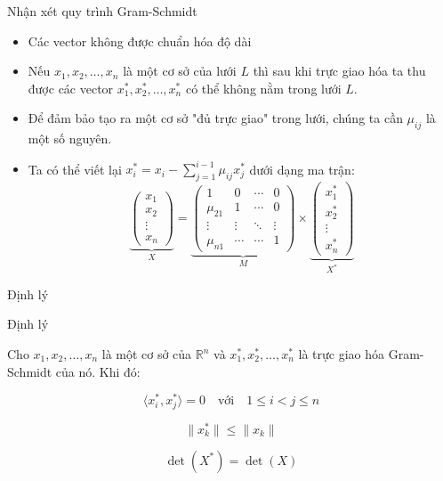 \begin{frame}{Nhận xét quy trình Gram-Schmidt}

\begin{itemize}
\item Các vector không được chuẩn hóa độ dài

\item Nếu $x_1, x_2, \dots, x_n$ là một cơ sở của lưới $L$ thì sau khi trực giao hóa ta thu được các vector $x_1^*, x_2^*, \dots, x_n^*$ có thể không nằm trong lưới $L$.
\item Để đảm bảo tạo ra một cơ sở "đủ trực giao" trong lưới, chúng ta cần $\mu_{ij}$ là một số nguyên.

\item Ta có thể viết lại $x_i^* = x_i - \sum_{j=1}^{i-1} \mu_{ij} x_j^*$ dưới dạng ma trận:
$$\underbrace{\left(\begin{array}{c}
x_1 \\
x_2 \\
\vdots \\
x_n
\end{array}\right)}_{X} = \underbrace{\left(\begin{array}{cccc}
1 & 0 & \cdots & 0 \\
\mu_{21} & 1 & \cdots & 0 \\
\vdots & \vdots & \ddots & \vdots \\
\mu_{n1} & \cdots & \cdots & 1
\end{array}\right)}_{M} \times \underbrace{\left(\begin{array}{c}
x_1^* \\
x_2^* \\
\vdots \\
x_n^*
\end{array}\right)}_{X^*} $$

\end{itemize}

\end{frame}
\begin{frame}{Định lý}

\begin{block}{Định lý}

Cho $x_1, x_2, \ldots, x_n$ là một cơ sở của $\mathbb{R}^n$
và $x_1^*, x_2^*, \ldots, x_n^*$ là trực giao hóa Gram-Schmidt của nó. Khi đó:

\begin{equation} \label{equation:dinh_li_Gram-Schmidt1}
\langle x_i^*, x_j^* \rangle = 0 \quad \text{với} \quad 1 \leq i < j \leq n
\end{equation}

\begin{equation} \label{equation:dinh_li_Gram-Schmidt2}
\|x_k^*\| \leq \|x_k\|
\end{equation}

\begin{equation} \label{equation:dinh_li_Gram-Schmidt3}
\det(X^*) = \det(X)
\end{equation}

\end{block}

\end{frame}
